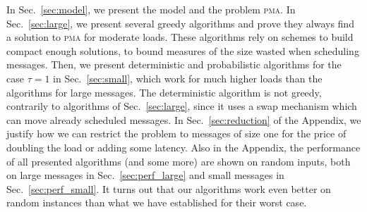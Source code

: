 \documentclass[a4paper,cleveref, autoref, thm-restate,UKenglish]{lipics-v2019}
\newcommand\pma{\textsc{pma}\xspace}
\begin{document}
In Sec.~\ref{sec:model}, we present the model and the problem \pma. In Sec.~\ref{sec:large},
we present several greedy algorithms and prove they always find a solution to \pma for moderate loads. 
These algorithms rely on schemes to build compact enough solutions, to bound measures of the size wasted when scheduling messages. Then, we present deterministic and probabilistic algorithms for the case $\tau = 1$ in Sec.~\ref{sec:small}, which work for much higher loads than the algorithms for large messages. The deterministic algorithm is not greedy, contrarily to algorithms of Sec.~\ref{sec:large}, since it uses a swap mechanism which can move already scheduled messages. 
 In Sec.~\ref{sec:reduction} of the Appendix, we justify how we can restrict the problem to messages of size one for the price of doubling the load or adding some latency. Also in the Appendix, the performance of all presented algorithms (and some more) are shown on random inputs, both on large messages in Sec.~\ref{sec:perf_large} and small messages in Sec.~\ref{sec:perf_small}. It turns out that our algorithms work even better on random instances than what we have established for their worst case.
\end{document}

